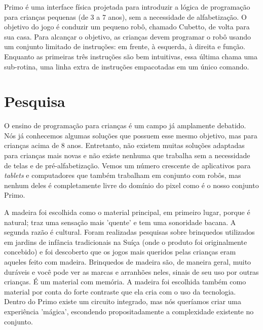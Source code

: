 \documentclass[paper=a4, fontsize=11pt]{scrartcl} %
\numberwithin{equation}{section} %
\numberwithin{figure}{section} %
\numberwithin{table}{section} %
\begin{document}
Primo é uma interface física projetada para introduzir a lógica de programação para crianças pequenas (de 3 a 7 anos), sem a necessidade de alfabetização. O objetivo do jogo é conduzir um pequeno robô, chamado Cubetto, de volta para sua casa. Para alcançar o objetivo, as crianças devem programar o robô usando um conjunto limitado de instruções: em frente, à esquerda, à direita e função. Enquanto as primeiras três instruções são bem intuitivas, essa última chama uma sub-rotina, uma linha extra de instruções empacotadas em um único comando.

\section{Pesquisa}

O ensino de programação para crianças é um campo já amplamente debatido. Nós já conhecemos algumas soluções que possuem esse mesmo objetivo, mas para crianças acima de 8 anos. Entretanto, não existem muitas soluções adaptadas para crianças mais novas e não existe nenhuma que trabalha sem a necessidade de telas e de pré-alfabetização. Vemos um número crescente de aplicativos para \textit{tablets} e computadores que também trabalham em conjunto com robôs, mas nenhum deles é completamente livre do domínio do pixel como é o nosso conjunto Primo.

A madeira foi escolhida como o material principal, em primeiro lugar, porque é natural; traz uma sensação mais 'quente' e tem uma sonoridade bacana. A segunda razão é cultural. Foram realizadas pesquisas sobre brinquedos utilizados em jardins de infância tradicionais na Suíça (onde o produto foi originalmente concebido) e foi descoberto que os jogos mais queridos pelas crianças eram aqueles feito com madeira. Brinquedos de madeira são, de maneira geral, muito duráveis e você pode ver as marcas e arranhões neles, sinais de seu uso por outras crianças. É um material com memória. A madeira foi escolhida também como material por conta do forte contraste que ela cria com o uso da tecnologia. Dentro do Primo existe um circuito integrado, mas nós queríamos criar uma experiência 'mágica', escondendo propositadamente a complexidade existente no conjunto.
\end{document}
